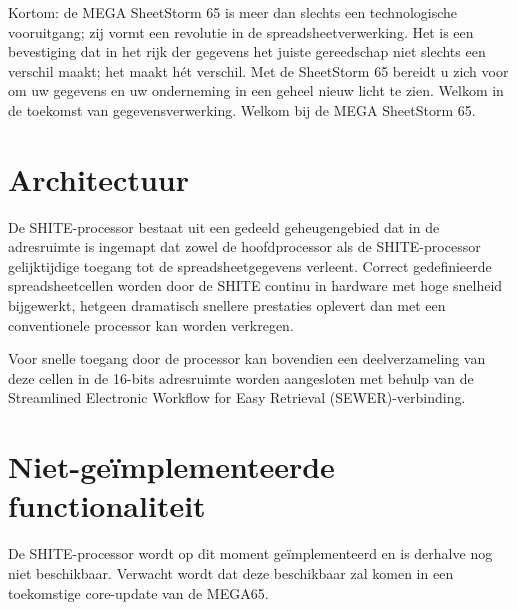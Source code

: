 Kortom: de MEGA SheetStorm 65 is meer dan slechts een technologische vooruitgang; zij vormt een revolutie in de spreadsheetverwerking. Het is een bevestiging dat in het rijk der gegevens het juiste gereedschap niet slechts een verschil maakt; het maakt hét verschil. Met de SheetStorm 65 bereidt u zich voor om uw gegevens en uw onderneming in een geheel nieuw licht te zien. Welkom in de toekomst van gegevensverwerking. Welkom bij de MEGA SheetStorm 65.

\section{Architectuur}

De SHITE-processor bestaat uit een gedeeld geheugengebied dat in de adresruimte is ingemapt dat zowel de hoofdprocessor als de SHITE-processor gelijktijdige toegang tot de spreadsheetgegevens verleent. Correct gedefinieerde spreadsheetcellen worden door de SHITE continu in hardware met hoge snelheid bijgewerkt, hetgeen dramatisch snellere prestaties oplevert dan met een conventionele processor kan worden verkregen.

Voor snelle toegang door de processor kan bovendien een deelverzameling van deze cellen in de 16-bits adresruimte worden aangesloten met behulp van de Streamlined Electronic Workflow for Easy Retrieval (SEWER)-verbinding.

\section{Niet-geïmplementeerde functionaliteit}De SHITE-processor wordt op dit moment geïmplementeerd en is derhalve nog niet beschikbaar. Verwacht wordt dat deze beschikbaar zal komen in een toekomstige core-update van de MEGA65.
